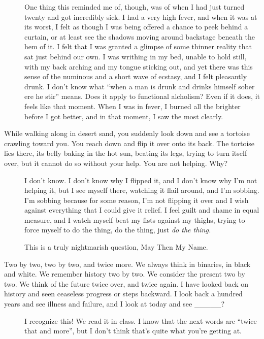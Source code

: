 \begin{description}
One thing this reminded me of, though, was of when I had just turned twenty and got incredibly sick. I had a very high fever, and when it was at its worst, I felt as though I was being offered a chance to peek behind a curtain, or at least see the shadows moving around backstage beneath the hem of it. I felt that I was granted a glimpse of some thinner reality that sat just behind our own. I was writhing in my bed, unable to hold still, with my back arching and my tongue sticking out, and yet there was this sense of the numinous and a short wave of ecstasy, and I felt pleasantly drunk. I don't know what ``when a man is drunk and drinks himself sober ere he stir'' means. Does it apply to functional alcholism? Even if it does, it feels like that moment. When I was in fever, I burned all the brighter before I got better, and in that moment, I saw the most clearly.
\item[While walking along in desert sand, you suddenly look down and see a tortoise crawling toward you. You reach down and flip it over onto its back. The tortoise lies there, its belly baking in the hot sun, beating its legs, trying to turn itself over, but it cannot do so without your help. You are not helping. Why?]
I don't know. I don't know why I flipped it, and I don't know why I'm not helping it, but I see myself there, watching it flail around, and I'm sobbing. I'm sobbing because for some reason, I'm not flipping it over and I wish against everything that I could give it relief. I feel guilt and shame in equal measure, and I watch myself beat my fists against my thighs, trying to force myself to do the thing, do the thing, just \emph{do the thing.}

This is a truly nightmarish question, May Then My Name.
\item[Two by two, two by two, and twice more. We always think in binaries, in black and white. We remember history two by two. We consider the present two by two. We think of the future twice over, and twice again. I have looked back on history and seen ceaseless progress or steps backward. I look back a hundred years and see illness and failure, and I look at today and see \_\_\_\_\_?]
I recognize this! We read it in class. I know that the next words are ``twice that and more'', but I don't think that's quite what you're getting at.


\end{description}
